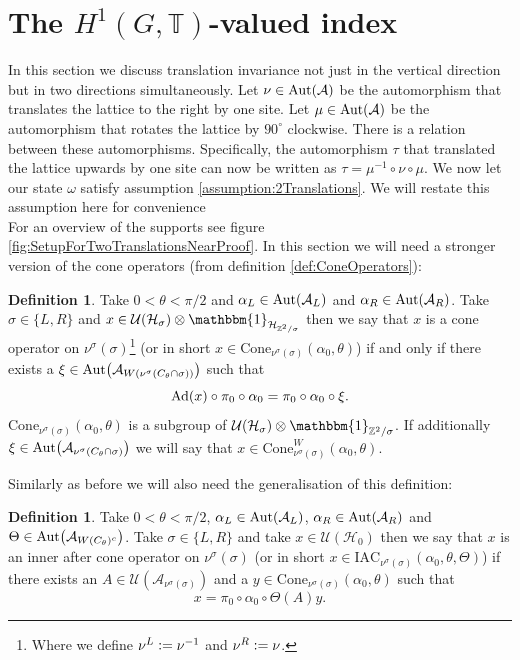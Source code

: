 \documentclass[12pt,a4paper,twoside]{article}
\newcommand{\IAC}{\textrm{IAC}}
\newcommand{\defeq}{\vcentcolon=}
\let\originalleft\left
\let\originalright\right
\renewcommand{\left}{\mathopen{}\mathclose\bgroup\originalleft}
\renewcommand{\right}{\aftergroup\egroup\originalright}
\newcommand{\UU}{\mathcal U}
\newcommand{\HH}{\mathcal H}
\newcommand{\ZZ}{\mathbb Z}
\newcommand{\TT}{\mathbb T}
\renewcommand{\AA}{\mathcal A}
\newcommand{\id}{\mathbbm{1}}
\newcommand{\Ad}[1]{\textrm{Ad}\left(#1\right)}
\newcommand{\Aut}[1]{\textrm{Aut}\left(#1\right)}
\theoremstyle{definition}
\newtheorem{definition}[theorem]{Definition}
\numberwithin{equation}{section}
\begin{document}
\section{The $H^1(G,\TT)$-valued index}\label{sec:TwoDirectionTraslationInvariance}
In this section we discuss translation invariance not just in the vertical direction but in two directions simultaneously. Let $\nu\in\Aut{\AA}$ be the automorphism that translates the lattice to the right by one site. Let $\mu\in\Aut{\AA}$ be the automorphism that rotates the lattice by $90^\circ$ clockwise. There is a relation between these automorphisms. Specifically, the automorphism $\tau$ that translated the lattice upwards by one site can now be written as $\tau=\mu^{-1}\circ\nu\circ\mu$. We now let our state $\omega$ satisfy assumption \ref{assumption:2Translations}. We will restate this assumption here for convenience
\assumptionTwo*$\:$\\
For an overview of the supports see figure \ref{fig:SetupForTwoTranslationsNearProof}. In this section we will need a stronger version of the cone operators (from definition \ref{def:ConeOperators}):
\begin{definition}
	Take $0<\theta<\pi/2$ and $\alpha_L\in\Aut{\AA_{L}}$ and $\alpha_R\in\Aut{\AA_{R}}$. Take $\sigma\in\{L,R\}$ and $x\in\UU(\HH_{\sigma})\otimes\id_{\HH_{\ZZ^2/\sigma}}$ then we say that $x$ is a cone operator on $\nu^\sigma(\sigma)$\footnote{Where we define $\nu^L\defeq \nu^{-1}$ and $\nu^R\defeq \nu$.} (or in short $x\in\textrm{Cone}_{\nu^\sigma(\sigma)}(\alpha_0,\theta)$) if and only if there exists a $\xi\in\Aut{\AA_{W(\nu^\sigma(C_\theta\cap\sigma))}}$ such that
	\begin{equation}
		\Ad{x}\circ\pi_0\circ\alpha_0=\pi_0\circ\alpha_0\circ\xi.
	\end{equation}
	$\textrm{Cone}_{\nu^\sigma(\sigma)}(\alpha_0,\theta)$ is a subgroup of $\UU(\HH_\sigma)\otimes\id_{\ZZ^2/\sigma}$. If additionally $\xi\in\Aut{\AA_{\nu^\sigma(C_\theta\cap\sigma)}}$ we will say that $x\in\textrm{Cone}_{\nu^\sigma(\sigma)}^W(\alpha_0,\theta)$.
\end{definition}
Similarly as before we will also need the generalisation of this definition:
\begin{definition}
	Take $0<\theta<\pi/2$, $\alpha_L\in\Aut{\AA_{L}}$, $\alpha_R\in\Aut{\AA_{R}}$ and $\Theta\in\Aut{\AA_{W(C_\theta)^c}}$. Take $\sigma\in\{L,R\}$ and take $x\in\UU(\HH_0)$ then we say that $x$ is an inner after cone operator on $\nu^\sigma(\sigma)$ (or in short $x\in \IAC_{\nu^\sigma(\sigma)}(\alpha_0,\theta,\Theta)$) if there exists an $A\in\UU(\AA_{\nu^\sigma(\sigma)})$ and a $y\in\textrm{Cone}_{\nu^\sigma(\sigma)}(\alpha_0,\theta)$ such that
	\begin{equation}
		x=\pi_0\circ\alpha_0\circ\Theta(A)y.
	\end{equation}
\end{definition}
\end{document}
